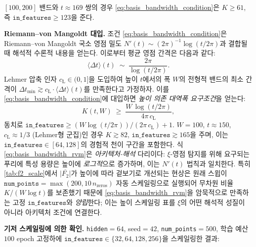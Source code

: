 \documentclass[11pt, a4paper]{article}
\theoremstyle{definition}
\theoremstyle{plain}
\begin{document}
$[100,200]$ 밴드와 $t\approx 169$ 쌍의 경우 \eqref{eq:basis_bandwidth_condition}은 $K\geq 61$, 즉 $\texttt{in\_features}\geq 123$을 준다.

\smallskip
\noindent\textbf{Riemann--von Mangoldt 대입.} 조건 \eqref{eq:basis_bandwidth_condition}은 Riemann--von Mangoldt 국소 영점 밀도 $N'(t)\sim (2\pi)^{-1}\log(t/2\pi)$과 결합될 때 해석적 수론적 내용을 얻는다. 이로부터 평균 영점 간격은 다음과 같다:
\begin{equation}
  \langle\Delta t\rangle(t)\;\sim\;\frac{2\pi}{\log(t/2\pi)}.
\end{equation}
Lehmer 압축 인자 $c_{\mathrm{L}}\in(0,1]$을 도입하여 높이 $t$에서의 폭 $W$의 전형적 밴드의 최소 간격이 $\Delta t_{\min}\gtrsim c_{\mathrm{L}}\cdot\langle\Delta t\rangle(t)$를 만족한다고 가정하자. 이를 \eqref{eq:basis_bandwidth_condition}에 대입하면 \emph{높이 의존 대역폭 요구조건}을 얻는다:
\begin{equation}
  K(t,W)\;\geq\;
  \frac{W\,\log(t/2\pi)}{4\pi\,c_{\mathrm{L}}},
  \label{eq:basis_bandwidth_rvm}
\end{equation}
동치로 $\texttt{in\_features}\geq (W\log(t/2\pi))/(2\pi\,c_{\mathrm{L}})+1$. $W=100$, $t\approx 150$, $c_{\mathrm{L}}\approx 1/3$ (Lehmer형 군집)인 경우 $K\gtrsim 82$, $\texttt{in\_features}\gtrsim 165$을 주며, 이는 $\texttt{in\_features}\in[64,128]$의 경험적 천이 구간을 포함한다. 식 \eqref{eq:basis_bandwidth_rvm}은 \emph{아키텍처-해석} 다리이다: $\xi$-영점 탐지를 위해 요구되는 푸리에 특성 용량은 높이에 \emph{로그적}으로 증가하며, 이는 $N'(t)$ 법칙과 일치한다. 특히 \cref{tab:f2_scale}에서 $\overline{|F_2|}$가 높이에 따라 겉보기로 개선되는 현상은 원래 스윕이 $\texttt{num\_points}=\max(200,10\,n_{\mathrm{zeros}})$ 자동 스케일링으로 실행되어 무차원 비율 $K/(W\log t)$를 보존했기 때문에 \eqref{eq:basis_bandwidth_rvm}을 암묵적으로 만족하는 고정 $\texttt{in\_features}$와 \emph{양립}한다; 이는 높이 스케일링 표를 $\xi$의 어떤 해석적 성질이 아니라 아키텍처 조건에 연결한다.

\smallskip
\noindent\textbf{기저 스케일링에 의한 확인.} \texttt{hidden}$=64$, seed$=42$, \texttt{num\_points}$=500$, 학습 예산 $100$ epoch 고정하에 $\texttt{in\_features}\in\{32,64,128,256\}$을 스케일링한 결과:
\end{document}
